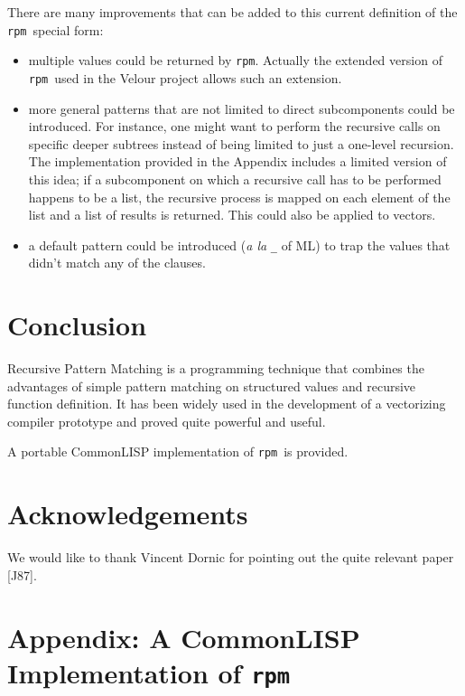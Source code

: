 \documentclass[a4paper,11pt]{article}
\newcommand{\rpm}{\texttt{rpm}}
\begin{document}
There are many improvements that can be added to this current
definition of the \rpm\ special form: 
\begin{itemize}
\item
	multiple values could be returned by \rpm. Actually the extended
version of \rpm\ used in the Velour project allows such an extension.
\item
	more general patterns that are not limited to direct
subcomponents could be introduced. For instance, one might want to
perform the recursive calls on specific deeper subtrees instead of
being limited to just a one-level recursion. The implementation
provided in the Appendix includes a limited version of this idea; if a
subcomponent on which a recursive call has to be performed happens to
be a list, the recursive process is mapped on each element of the list
and a list of results is returned. This could also be applied to
vectors.
\item
	a default pattern could be introduced (\emph{a la} \texttt{\_} of
ML) to trap the values that didn't match any of the clauses.
\end{itemize}

\section{Conclusion}

Recursive Pattern Matching is a programming technique that combines
the advantages of simple pattern matching on structured values and
recursive function definition. It has been widely used in the
development of a vectorizing compiler prototype and proved quite
powerful and useful. 

A portable CommonLISP implementation of \rpm\ is provided. 

\section*{Acknowledgements}

We would like to thank Vincent Dornic for pointing out the quite
relevant paper [J87].

\newpage
\section*{Appendix: A CommonLISP Implementation of \rpm}
\end{document}
